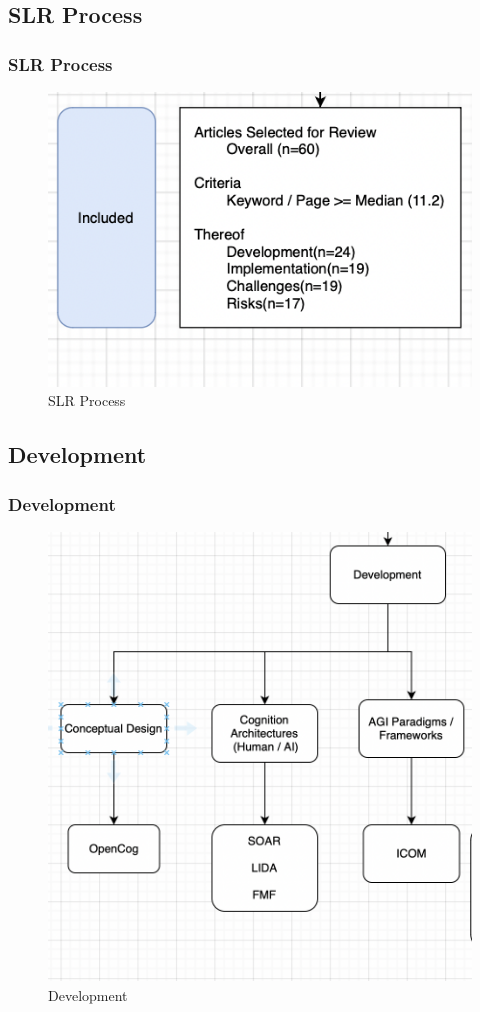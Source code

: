 \documentclass[
	11pt, %
]{beamer}
\begin{document}

\subsection{SLR Process}
\begin{frame}
	\frametitle{SLR Process}
	
	\begin{figure}
		\includegraphics[width=\textwidth,height=\textheight,keepaspectratio]{Images/slr2.png}
		\caption{SLR Process}
	\end{figure}
\end{frame}


\subsection{Development}

\begin{frame}
	\frametitle{Development}
	
	\begin{figure}
		\includegraphics[width=0.8\linewidth]{Images/development.png}
		\caption{Development}
	\end{figure}
\end{frame}
\end{document}
